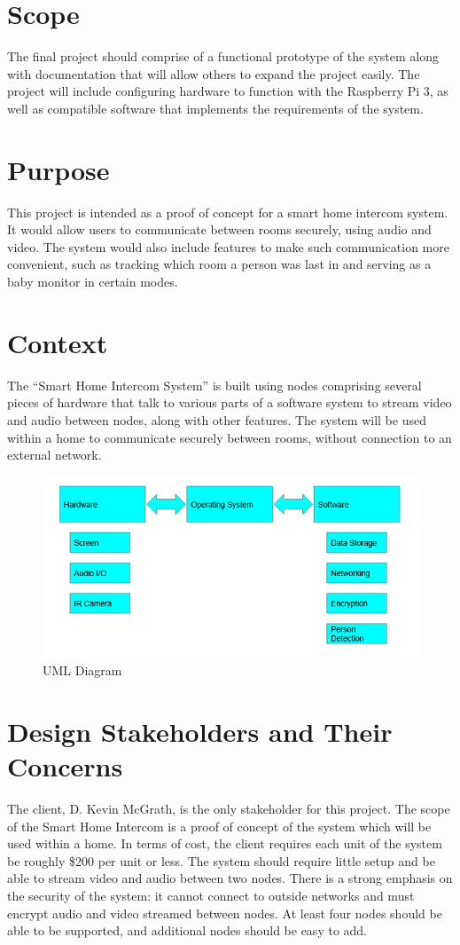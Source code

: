 \documentclass[onecolumn, draftclsnofoot,10pt, compsoc]{IEEEtran}
\begin{document}
\section{Scope}
The final project should comprise of a functional prototype of the system along with documentation that will allow others to expand the project easily. The project will include configuring hardware to function with the Raspberry Pi 3, as well as compatible software that implements the requirements of the system. 

\section{Purpose}
This project is intended as a proof of concept for a smart home intercom system. It would allow users to communicate between rooms securely, using audio and video. The system would also include features to make such communication more convenient, such as tracking which room a person was last in and serving as a baby monitor in certain modes. 

\section{Context}
The “Smart Home Intercom System” is built using nodes comprising several pieces of hardware that talk to various parts of a software system to stream video and audio between nodes, along with other features. The system will be used within a home to communicate securely between rooms, without connection to an external network. 

\begin{figure}[ht]
\centering
\includegraphics{UML}
\caption{UML Diagram}
\end{figure}

\section{Design Stakeholders and Their Concerns}
The client, D. Kevin McGrath, is the only stakeholder for this project. The scope of the Smart Home Intercom is a proof of concept of the system which will be used within a home. In terms of cost, the client requires each unit of the system be roughly \$200 per unit or less. The system should require little setup and be able to stream video and audio between two nodes. There is a strong emphasis on the security of the system: it cannot connect to outside networks and must encrypt audio and video streamed between nodes. At least four nodes should be able to be supported, and additional nodes should be easy to add.
\end{document}
